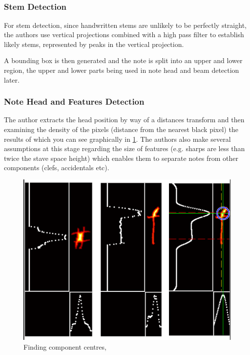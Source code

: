 \subsection{\cite{benoptical}}

\subsubsection{Stem Detection}

For stem detection, since handwritten stems are unlikely to be perfectly straight, the authors use vertical projections combined with a high pass filter to establish likely stems, represented by peaks in the vertical projection.

A bounding box is then generated and the note is split into an upper and lower region, the upper and lower parts being used in note head and beam detection later.

\subsubsection{Note Head and Features Detection}

The author extracts the head position by way of a distances transform and then examining the density of the pixels (distance from the nearest black pixel) the results of which you can see graphically in \cref{fig:giloh-component-centre}. The authors also make several assumptions at this stage regarding the size of features (e.g. sharps are less than twice the stave space height) which enables them to separate notes from other components (clefs, accidentals etc).

\begin{figure}[H]
  \centering
  \includegraphics{gfx/prior-research/giloh-component-centre}
  \caption{Finding component centres, \parencite{benoptical}}
  \label{fig:giloh-component-centre}
\end{figure}
